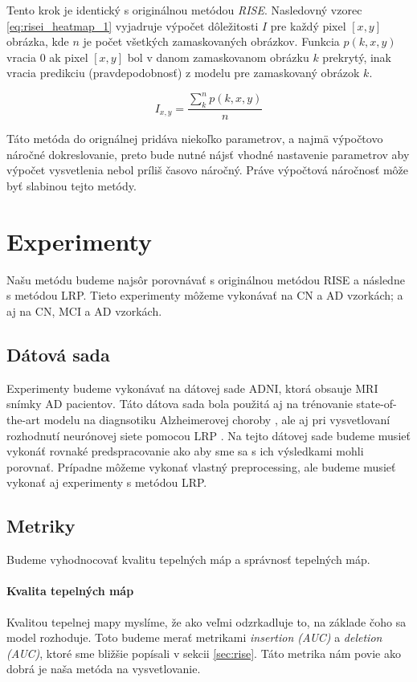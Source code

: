 Tento krok je identický s originálnou metódou \textit{RISE}. Nasledovný vzorec \ref{eq:risei_heatmap_1} vyjadruje výpočet dôležitosti $I$ pre každý pixel $[x, y]$ obrázka, kde $n$ je počet všetkých zamaskovaných obrázkov. Funkcia $p(k, x, y)$ vracia $0$ ak pixel $[x, y]$ bol v danom zamaskovanom obrázku $k$ prekrytý, inak vracia predikciu (pravdepodobnosť) z modelu pre zamaskovaný obrázok $k$.

\begin{equation}
    I_{x, y} = \frac{\sum_{k}^{n} p(k, x, y)}{n}
    \label{eq:risei_heatmap_1}
\end{equation}

Táto metóda do orignálnej pridáva niekoľko parametrov, a najmä výpočtovo náročné dokreslovanie, preto bude nutné nájsť vhodné nastavenie parametrov aby výpočet vysvetlenia nebol príliš časovo náročný. Práve výpočtová náročnosť môže byť slabinou tejto metódy.

\section{Experimenty}

Našu metódu budeme najsôr porovnávať s originálnou metódou RISE a následne s metódou LRP. Tieto experimenty môžeme vykonávať na CN a AD vzorkách; a aj na CN, MCI a AD vzorkách.

\subsection{Dátová sada} Experimenty budeme vykonávať na dátovej sade ADNI, ktorá obsauje MRI snímky AD pacientov. Táto dátova sada bola použitá aj na trénovanie state-of-the-art modelu na diagnsotiku Alzheimerovej choroby \cite{esmaeilzadeh2018end}, ale aj pri vysvetlovaní rozhodnutí neurónovej siete pomocou LRP \cite{bohle2019layer}. Na tejto dátovej sade budeme musieť vykonáť rovnaké predspracovanie ako \citeauthor*{bohle2019layer} aby sme sa s ich výsledkami mohli porovnať. Prípadne môžeme vykonať vlastný preprocessing, ale budeme musieť vykonať aj experimenty s metódou LRP.

\subsection{Metriky}

Budeme vyhodnocovať kvalitu tepelných máp a správnosť tepelných máp. 

\paragraph{Kvalita tepelných máp} Kvalitou tepelnej mapy myslíme, že ako veľmi odzrkadluje to, na základe čoho sa model rozhoduje. Toto budeme merať metrikami \textit{insertion (AUC)} a \textit{deletion (AUC)}, ktoré sme bližšie popísali v sekcii \ref{sec:rise}. Táto metrika nám povie ako dobrá je naša metóda na vysvetlovanie.

